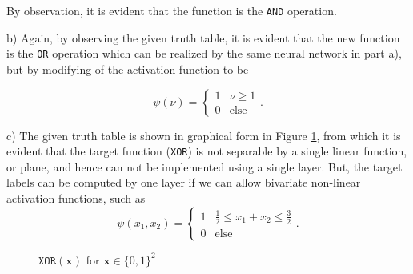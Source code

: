 \documentclass{article}
\renewcommand{\vec}[1]{\mathbf{#1}}
\begin{document}
    By observation, it is evident that the function is the \texttt{AND} 
    operation.

    b) Again, by observing the given truth table, it is evident that the new 
    function is the \texttt{OR} operation which can be realized by the same 
    neural network in part a), but by modifying of the activation 
    function to be 

    \[
        \psi(\nu) = 
        \begin{cases}
            1 & \nu \geq 1 \\
            0 & \text{else }
        \end{cases}.
    \]

    c) The given truth table is shown in graphical form in Figure 
    \ref{fig:XOR}, from which it is evident that the target function (\texttt
    {XOR}) is not separable by a single linear function, or plane, and hence 
    can not be implemented using a single layer. But, the target labels can 
    be computed by one layer if we can allow bivariate non-linear 
    activation functions, such as
    \[
        \psi(x_1, x_2) = 
        \begin{cases}
            1 & \frac{1}{2} \leq x_1 + x_2 \leq \frac{3}{2} \\
            0 & \text{else}
        \end{cases}.
    \]

    \begin{figure}[ht]
        \centering
        \caption{$\texttt{XOR}(\vec{x})$ for $\vec{x} \in \{0,1\}^2$}
        \label{fig:XOR}
    \end{figure}
\end{document}
